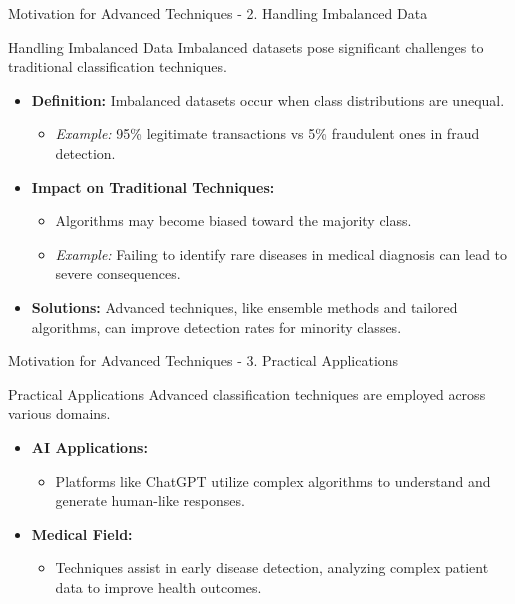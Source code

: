 \documentclass[aspectratio=169]{beamer}
\begin{document}
\begin{frame}[fragile]{Motivation for Advanced Techniques - 2. Handling Imbalanced Data}
    \begin{block}{Handling Imbalanced Data}
        Imbalanced datasets pose significant challenges to traditional classification techniques.
    \end{block}
    \begin{itemize}
        \item \textbf{Definition:} Imbalanced datasets occur when class distributions are unequal.
            \begin{itemize}
                \item \textit{Example:} 95\% legitimate transactions vs 5\% fraudulent ones in fraud detection.
            \end{itemize}
        \item \textbf{Impact on Traditional Techniques:}
            \begin{itemize}
                \item Algorithms may become biased toward the majority class.
                \item \textit{Example:} Failing to identify rare diseases in medical diagnosis can lead to severe consequences.
            \end{itemize}
        \item \textbf{Solutions:} Advanced techniques, like ensemble methods and tailored algorithms, can improve detection rates for minority classes.
    \end{itemize}
\end{frame}

\begin{frame}[fragile]{Motivation for Advanced Techniques - 3. Practical Applications}
    \begin{block}{Practical Applications}
        Advanced classification techniques are employed across various domains.
    \end{block}
    \begin{itemize}
        \item \textbf{AI Applications:} 
            \begin{itemize}
                \item Platforms like ChatGPT utilize complex algorithms to understand and generate human-like responses.
            \end{itemize}
        \item \textbf{Medical Field:} 
            \begin{itemize}
                \item Techniques assist in early disease detection, analyzing complex patient data to improve health outcomes.
            \end{itemize}
    \end{itemize}
\end{frame}
\end{document}
